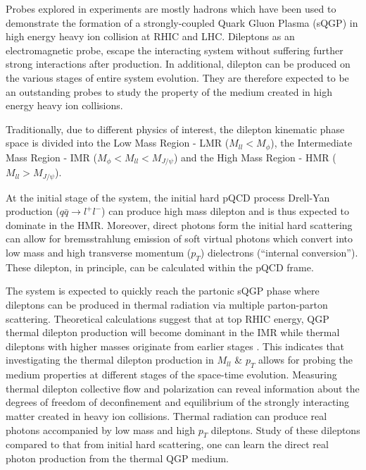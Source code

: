 Probes explored in experiments are mostly hadrons which have been
used to demonstrate the formation of a strongly-coupled Quark Gluon
Plasma (sQGP) in high energy heavy ion collision at RHIC and LHC.
Dileptons as an electromagnetic probe, escape the interacting system
without suffering further strong interactions after production. In
additional, dilepton can be produced on the various stages of entire
system evolution. They are therefore expected to be an outstanding
probes to study the property of the medium created in high energy
heavy ion collisions. 

Traditionally, due to different physics of interest, the dilepton
kinematic phase space is divided into the Low Mass Region - LMR ($M_{ll}<M_{\phi}$),
the Intermediate Mass Region - IMR ($M_{\phi}<M_{ll}<M_{J/\psi}$)
and the High Mass Region - HMR ($M_{ll}>M_{J/\psi}$). 

At the initial stage of the system, the initial hard pQCD process
Drell-Yan production ($q\bar{q}\rightarrow l^{+}l^{-}$) can produce
high mass dilepton and is thus expected to dominate in the HMR. Moreover,
direct photons form the initial hard scattering can allow for bremsstrahlung
emission of soft virtual photons which convert into low mass and high
transverse momentum ($p_{T}$) dielectrons (``internal conversion'').
These dilepton, in principle, can be calculated within the pQCD frame.

The system is expected to quickly reach the partonic sQGP phase where
dileptons can be produced in thermal radiation via multiple parton-parton
scattering. Theoretical calculations suggest that at top RHIC energy,
QGP thermal dilepton production will become dominant in the IMR while
thermal dileptons with higher masses originate from earlier stages
\cite{PhysRevC.63.054907}. This indicates that investigating the
thermal dilepton production in $M_{ll}$ \& $p_{T}$ allows for probing
the medium properties at different stages of the space-time evolution.
Measuring thermal dilepton collective flow and polarization can reveal
information about the degrees of freedom of deconfinement and equilibrium
of the strongly interacting matter created in heavy ion collisions\cite{Deng2011581,PhysRevC.75.054909,Shuryak:qy}.
Thermal radiation can produce real photons accompanied by low mass
and high $p_{T}$ dileptons. Study of these dileptons compared to
that from initial hard scattering, one can learn the direct real photon
production from the thermal QGP medium. 

